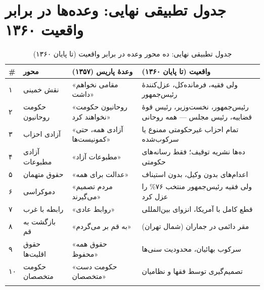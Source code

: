 \section{جدول تطبیقی نهایی: وعده‌ها در برابر واقعیت ۱۳۶۰}

\begin{longtable}{%
    >{\centering\arraybackslash}p{}
    >{\raggedleft\arraybackslash}p{}
    >{\raggedleft\arraybackslash}p{}
    >{\raggedleft\arraybackslash}p{}}
\toprule
\rowcolor{cAccent!10}
\textbf{\#} & \textbf{محور} & \textbf{وعدهٔ پاریس (۱۳۵۷)} & \textbf{واقعیت (تا پایان ۱۳۶۰)} \\
\midrule
\endhead

۱ &
نقش خمینی &
«مقامی نخواهم داشت» &
ولی فقیه، فرمانده‌کل، عزل‌کنندهٔ رئیس‌جمهور \\
\midrule

۲ &
حکومت روحانیون &
«روحانیون حکومت نخواهند کرد» &
رئیس‌جمهور، نخست‌وزیر، رئیس قوهٔ قضاییه، رئیس مجلس — همه روحانی \\
\midrule

۳ &
آزادی احزاب &
«آزادی همه، حتی کمونیست‌ها» &
تمام احزاب غیرحکومتی ممنوع یا سرکوب‌شده \\
\midrule

۴ &
آزادی مطبوعات &
«مطبوعات آزاد» &
ده‌ها نشریه توقیف؛ فقط رسانه‌های حکومتی \\
\midrule

۵ &
حقوق متهمان &
«عدالت برای همه» &
اعدام‌های بدون وکیل، بدون استیناف \\
\midrule

۶ &
دموکراسی &
«مردم تصمیم می‌گیرند» &
ولی فقیه رئیس‌جمهور منتخب ۷۶\% را عزل کرد \\
\midrule

۷ &
رابطه با غرب &
«روابط عادی» &
قطع کامل با آمریکا، انزوای بین‌المللی \\
\midrule

۸ &
بازگشت به قم &
«به قم بر می‌گردم» &
مقر دائمی در جماران (شمال تهران) \\
\midrule

۹ &
حقوق اقلیت‌ها &
«حقوق همه محفوظ» &
سرکوب بهائیان، محدودیت سنی‌ها \\
\midrule

۱۰ &
حکومت متخصصان &
«حکومت دست متخصصان» &
تصمیم‌گیری توسط فقها و نظامیان \\

\bottomrule
\caption{جدول تطبیقی نهایی: ده محور وعده در برابر واقعیت (تا پایان ۱۳۶۰)}
\label{tab:final-comparison-1360}
\end{longtable}

